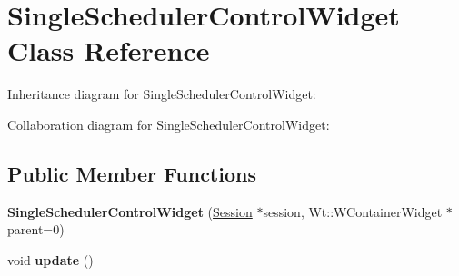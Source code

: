 \hypertarget{classSingleSchedulerControlWidget}{}\section{Single\+Scheduler\+Control\+Widget Class Reference}
\label{classSingleSchedulerControlWidget}


Inheritance diagram for Single\+Scheduler\+Control\+Widget\+:


Collaboration diagram for Single\+Scheduler\+Control\+Widget\+:
\subsection*{Public Member Functions}
\begin{DoxyCompactItemize}
\item 
{\bfseries Single\+Scheduler\+Control\+Widget} (\hyperlink{classSession}{Session} $\ast$session, Wt\+::\+W\+Container\+Widget $\ast$parent=0)\hypertarget{classSingleSchedulerControlWidget_ac463dfb932d501b881b62d39ce40beef}{}\label{classSingleSchedulerControlWidget_ac463dfb932d501b881b62d39ce40beef}

\item 
void {\bfseries update} ()\hypertarget{classSingleSchedulerControlWidget_ad1a40c63b98309c57ec06a7d53d1fb32}{}\label{classSingleSchedulerControlWidget_ad1a40c63b98309c57ec06a7d53d1fb32}

\end{DoxyCompactItemize}
